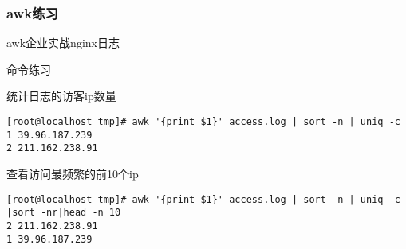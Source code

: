 \subsubsection{awk练习}
awk企业实战nginx日志
\begin{ascolorbox10}{命令练习}	
		\begin{ascboxJ}{统计日志的访客ip数量}
			\begin{lstlisting}[style=linux]
[root@localhost tmp]# awk '{print $1}' access.log | sort -n | uniq -c
1 39.96.187.239
2 211.162.238.91
			\end{lstlisting}
		\end{ascboxJ}

	\begin{ascboxJ}{查看访问最频繁的前10个ip}
		\begin{lstlisting}[style=linux]
[root@localhost tmp]# awk '{print $1}' access.log | sort -n | uniq -c |sort -nr|head -n 10
2 211.162.238.91
1 39.96.187.239
		\end{lstlisting}
	\end{ascboxJ}

	\end{ascolorbox10}







